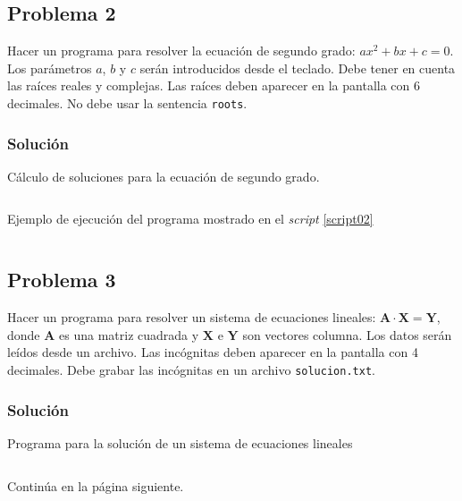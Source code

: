 \documentclass[a4paper,12pt,final]{article}
\begin{document}
  \newpage
  \subsection*{Problema 2}
    \noindent Hacer un programa para resolver la ecuación de segundo grado:
    $ax^2+bx+c=0$. Los parámetros $a$, $b$ y $c$ serán introducidos desde
    el teclado. Debe tener en cuenta las raíces reales y complejas. Las
    raíces deben aparecer en la pantalla con 6 decimales. No debe usar la
    sentencia \texttt{roots}.

    \subsubsection*{Solución}
      \begin{listing}[H]
        \caption{Cálculo de soluciones para la ecuación de segundo grado.}
        \label{script02}
        \inputminted[firstline=5]{matlab}{./laboratorio_1/problema02.m}
      \end{listing}

      \begin{listing}[H]
        \caption{Ejemplo de ejecución del programa mostrado en el
        \emph{script} \ref{script02}}
        \label{script02sample}
        \inputminted{text}{./laboratorio_1/problema02_sample.txt}
      \end{listing}
      \vspace{\fill}

  \newpage
  \subsection*{Problema 3}
    \noindent Hacer un programa para resolver un sistema de ecuaciones
    lineales: $\mathbf{A}\cdot\mathbf{X}=\mathbf{Y}$, donde $\mathbf{A}$ es
    una matriz cuadrada y $\mathbf{X}$ e $\mathbf{Y}$ son vectores columna.
    Los datos serán leídos desde un archivo. Las incógnitas deben aparecer
    en la pantalla con 4 decimales. Debe grabar las incógnitas en un
    archivo \texttt{solucion.txt}.

    \subsubsection*{Solución}
      \begin{listing}[H]
        \caption{Programa para la solución de un sistema de ecuaciones lineales}
        \label{script03}
        \inputminted[firstline=5,lastline=49]{matlab}{./laboratorio_1/problema03.m}
      \end{listing}
      \vspace{-1em}
      \noindent\small{Continúa en la página siguiente.}
      \vspace{\fill}
\end{document}
